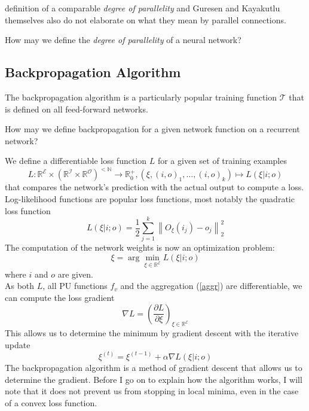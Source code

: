 \documentclass[a4paper,11pt]{article}
\begin{document}
definition of a comparable \emph{degree of parallelity} and Guresen and Kayakutlu themselves also do not elaborate on what they mean by parallel connections.
\begin{OP}
How may we define the \emph{degree of parallelity} of a neural network?
\end{OP}
\subsection{Backpropagation Algorithm}
The backpropagation algorithm is a particularly popular training function $\mathcal{T}$ that is defined on all feed-forward networks.
\begin{OP}
How may we define backpropagation for a given network function on a recurrent network?
\end{OP}
We define a differentiable loss function $L$ for a given set of training examples
\begin{equation}
L:\mathbb{R}^{\mathcal{E}}\times\left(\mathbb{R}^{\mathcal{I}}\times\mathbb{R}^{\mathcal{O}}\right)^{<\mathbb{N}}\to\mathbb{R}^+_0, \left(\xi,(i,o)_1,\dotsc,(i,o)_k\right)\mapsto L(\xi|i;o)
\end{equation}
that compares the network's prediction with the actual output to compute a loss. Log-likelihood functions are popular loss functions, most notably the quadratic loss function
\begin{equation}
L(\xi|i;o)=\frac12\sum_{j=1}^k\left\|O_{\xi}(i_j)-o_j\right\|_2^2
\end{equation}
The computation of the network weights is now an optimization problem:
\begin{equation}
\xi=\arg\min_{\xi\in\mathbb{R}^{\mathcal{E}}}L(\xi|i;o)
\end{equation}
where $i$ and $o$ are given.\\
As both $L$, all PU functions $f_v$ and the aggregation (\ref{aggr}) are differentiable, we can compute the loss gradient
\begin{equation}
\nabla L=\left(\frac{\partial L}{\partial \xi}\right)_{\xi\in\mathbb{R}^{\mathcal{E}}}
\end{equation}
This allows us to determine the minimum by gradient descent with the iterative update
\begin{equation}\label{update}
\xi^{(t)}=\xi^{(t-1)}+\alpha\nabla L(\xi|i;o)
\end{equation}
The backpropagation algorithm is a method of gradient descent that allows us to determine the gradient. Before I go on to explain how the algorithm works, I will note that it does not prevent us from stopping in local minima, even in the case of a convex loss function.
\end{document}
